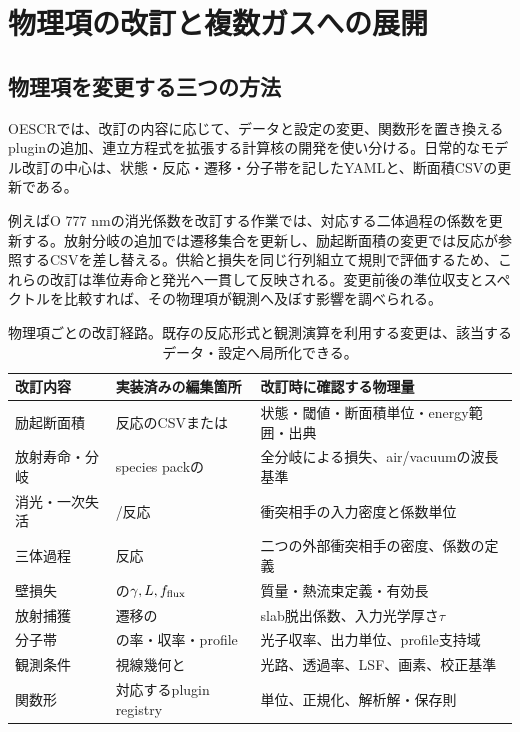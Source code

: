 \section{物理項の改訂と複数ガスへの展開}
\subsection{物理項を変更する三つの方法}
OESCRでは、改訂の内容に応じて、データと設定の変更、関数形を置き換えるpluginの追加、連立方程式を拡張する計算核の開発を使い分ける。日常的なモデル改訂の中心は、状態・反応・遷移・分子帯を記したYAMLと、断面積CSVの更新である。

例えばO 777 nmの消光係数を改訂する作業では、対応する二体過程の係数を更新する。放射分岐の追加では遷移集合を更新し、励起断面積の変更では反応が参照するCSVを差し替える。供給と損失を同じ行列組立て規則で評価するため、これらの改訂は準位寿命と発光へ一貫して反映される。変更前後の準位収支とスペクトルを比較すれば、その物理項が観測へ及ぼす影響を調べられる。

\begin{table}[htbp]
\centering\small
\begin{tabularx}{\linewidth}{p{31mm}p{42mm}Y}
\toprule
改訂内容 & 実装済みの編集箇所 & 改訂時に確認する物理量 \\
\midrule
励起断面積 & 反応のCSVまたは & 状態・閾値・断面積単位・energy範囲・出典 \\
放射寿命・分岐 & species packの & 全分岐による損失、air/vacuumの波長基準 \\
消光・一次失活 & /反応 & 衝突相手の入力密度と係数単位 \\
三体過程 & 反応 & 二つの外部衝突相手の密度、係数の定義 \\
壁損失 & の$\gamma,L,f_{\rm flux}$ & 質量・熱流束定義・有効長 \\
放射捕獲 & 遷移の & slab脱出係数、入力光学厚さ$\tau$ \\
分子帯 & の率・収率・profile & 光子収率、出力単位、profile支持域 \\
観測条件 & 視線幾何と & 光路、透過率、LSF、画素、校正基準 \\
関数形 & 対応するplugin registry & 単位、正規化、解析解・保存則 \\
\bottomrule
\end{tabularx}
\caption{物理項ごとの改訂経路。既存の反応形式と観測演算を利用する変更は、該当するデータ・設定へ局所化できる。}
\label{tab:edits}
\end{table}

